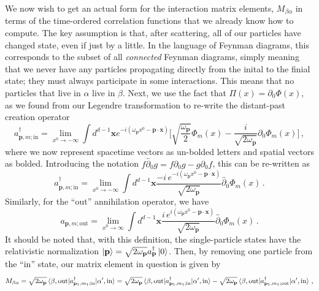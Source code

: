 \documentclass{article}
\numberwithin{equation}{subsection}
\begin{document}
We now wish to get an actual form for the interaction matrix elements, $M_{\beta\alpha}$ in terms of the time-ordered correlation functions that we already know how to compute.
The key assumption is that, after scattering, all of our particles have changed state, even if just by a little. In the language of Feynman diagrams, this corresponds to
the subset of all \textit{connected} Feynman diagrams, simply meaning that we never have any particles propagating directly from the inital to the finial state; they must always
participate in some interactions. This means that no particles that live in $\alpha$ live in $\beta$.
Next, we use the fact that $\Pi(x) = \partial_0\Phi(x)$, as we found from our Legendre transformation to re-write the distant-past creation operator
\begin{equation}
	a^\dag_{\mathbf{p},m;\text{in}} = \lim_{x^0\to-\infty}\int d^{d-1}\mathbf{x}e^{-i(\omega_\mathbf{p} x^0 - \mathbf{p}\cdot\mathbf{x})}
	\Bigg[\sqrt{\frac{\omega_{\mathbf{p}}}{2}}\Phi_m(x) - \frac{i}{\sqrt{2\omega_{\mathbf{p}}}}\partial_0\Phi_m(x)\Bigg]\,,
\end{equation}
where we now represent spacetime vectors as un-bolded letters and spatial vectors as bolded. Introducing the notation $f\overleftrightarrow{\partial_0}g = f\partial_0 g - g\partial_0 f$,
this can be re-written as
\begin{equation}
	a^\dag_{\mathbf{p},m;\text{in}} = \lim_{x^0\to-\infty}\int d^{d-1}\mathbf{x}
	\frac{-i\,e^{-i(\omega_\mathbf{p} x^0 - \mathbf{p}\cdot\mathbf{x})}}{\sqrt{2\omega_{\mathbf{p}}}}\overleftrightarrow{\partial_0}\Phi_m(x)\,.
\end{equation}
Similarly, for the ``out'' annihilation operator, we have
\begin{equation}
	a_{\mathbf{p},m;\text{out}} = \lim_{x^0\to\infty}\int d^{d-1}\mathbf{x}
	\frac{i\,e^{i(\omega_\mathbf{p} x^0 - \mathbf{p}\cdot\mathbf{x})}}{\sqrt{2\omega_{\mathbf{p}}}}\overleftrightarrow{\partial_0}\Phi_m(x)\,.
\end{equation}
It should be noted that, with this definition, the single-particle states have the relativistic normalization $\ket{\mathbf{p}} =
\sqrt{2\omega_{\mathbf{p}}}a^\dag_{\mathbf{p}}\ket{0}$.
Then, by removing one particle from the ``in'' state, our matrix element in question is given by
\begin{equation}
	M_{\beta\alpha} = \sqrt{2\omega_{\mathbf{p}}}\mel{\beta,\text{out}}{a^\dag_{\mathbf{p}_1,m_1;\text{in}}}{\alpha',\text{in}}
	= \sqrt{2\omega_{\mathbf{p}}}\mel{\beta,\text{out}}{a^\dag_{\mathbf{p}_1,m_1;\text{in}}}{\alpha',\text{in}}
	- \sqrt{2\omega_{\mathbf{p}}}\mel{\beta,\text{out}}{a^\dag_{\mathbf{p}_1,m_1;\text{out}}}{\alpha',\text{in}}\,,
\end{equation}
\end{document}
